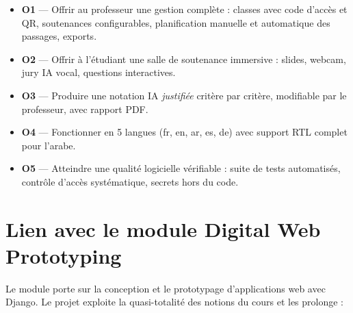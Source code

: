 \documentclass[12pt,a4paper]{report}
\begin{document}
\begin{itemize}
  \item \textbf{O1} --- Offrir au professeur une gestion complète : classes avec
        code d'accès et QR, soutenances configurables, planification manuelle et
        automatique des passages, exports.
  \item \textbf{O2} --- Offrir à l'étudiant une salle de soutenance immersive :
        slides, webcam, jury IA vocal, questions interactives.
  \item \textbf{O3} --- Produire une notation IA \emph{justifiée} critère par
        critère, modifiable par le professeur, avec rapport PDF.
  \item \textbf{O4} --- Fonctionner en 5 langues (fr, en, ar, es, de) avec
        support RTL complet pour l'arabe.
  \item \textbf{O5} --- Atteindre une qualité logicielle vérifiable : suite de
        tests automatisés, contrôle d'accès systématique, secrets hors du code.
\end{itemize}

\section{Lien avec le module Digital Web Prototyping}

Le module porte sur la conception et le prototypage d'applications web avec
Django. Le projet exploite la quasi-totalité des notions du cours et les
prolonge :
\end{document}
